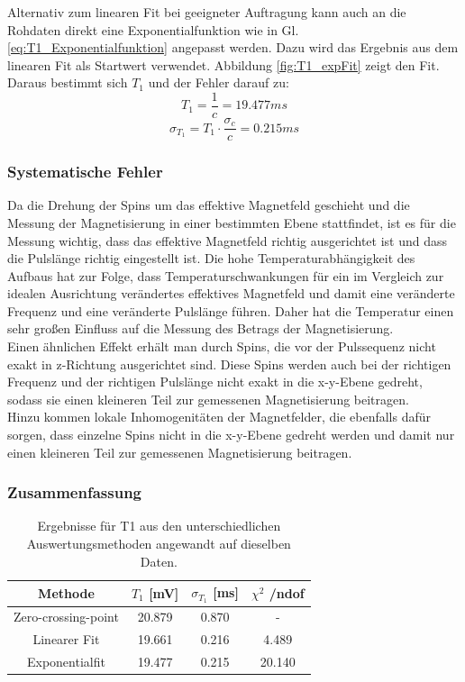 \documentclass[12pt,a4paper]{article}
\begin{document}
Alternativ zum linearen Fit bei geeigneter Auftragung kann auch an die Rohdaten direkt eine Exponentialfunktion  wie in Gl. \ref{eq:T1_Exponentialfunktion} angepasst werden. Dazu wird das Ergebnis aus dem linearen Fit als Startwert verwendet. Abbildung \ref{fig:T1_expFit} zeigt den Fit. Daraus bestimmt sich $T_1$ und der Fehler darauf zu:
\begin{equation*}
T_1 = \dfrac{1}{c} = 19.477 ms
\end{equation*}
\begin{equation*}
\sigma _{T_1} = T_1 \cdot \dfrac{\sigma _c}{c} = 0.215 ms
\end{equation*}

\subsubsection{Systematische Fehler} 
Da die Drehung der Spins um das effektive Magnetfeld geschieht und die Messung der Magnetisierung in einer bestimmten Ebene stattfindet, ist es für die Messung wichtig, dass das effektive Magnetfeld richtig ausgerichtet ist und dass die Pulslänge richtig eingestellt ist. Die hohe Temperaturabhängigkeit des Aufbaus hat zur Folge, dass Temperaturschwankungen für ein im Vergleich zur idealen Ausrichtung verändertes effektives Magnetfeld und damit eine veränderte Frequenz und eine veränderte Pulslänge führen. Daher hat die Temperatur einen sehr großen Einfluss auf die Messung des Betrags der Magnetisierung. \\
Einen ähnlichen Effekt erhält man durch Spins, die vor der Pulssequenz nicht exakt in z-Richtung ausgerichtet sind. Diese Spins werden auch bei der richtigen Frequenz und der richtigen Pulslänge nicht exakt in die x-y-Ebene gedreht, sodass sie einen kleineren Teil zur gemessenen Magnetisierung beitragen. \\
Hinzu kommen lokale Inhomogenitäten der Magnetfelder, die ebenfalls dafür sorgen, dass einzelne Spins nicht in die x-y-Ebene gedreht werden und damit nur einen kleineren Teil zur gemessenen Magnetisierung beitragen.

\subsubsection{Zusammenfassung}

\begin{table}
\centering
\begin{tabular}{|c|c|c|c|}
\hline 
Methode & $T_1$ [mV] & $\sigma _{T_1}$ [ms] & $\chi ^2$ /ndof \\ 
\hline 
Zero-crossing-point & 20.879 & 0.870 & - \\ 
\hline 
Linearer Fit & 19.661 & 0.216 & 4.489 \\ 
\hline 
Exponentialfit & 19.477 & 0.215 & 20.140 \\ 
\hline 
\end{tabular} 
\caption{Ergebnisse für T1 aus den unterschiedlichen Auswertungsmethoden angewandt auf dieselben Daten.}
\label{tab:T1_Ergebnisse}
\end{table}
\end{document}
